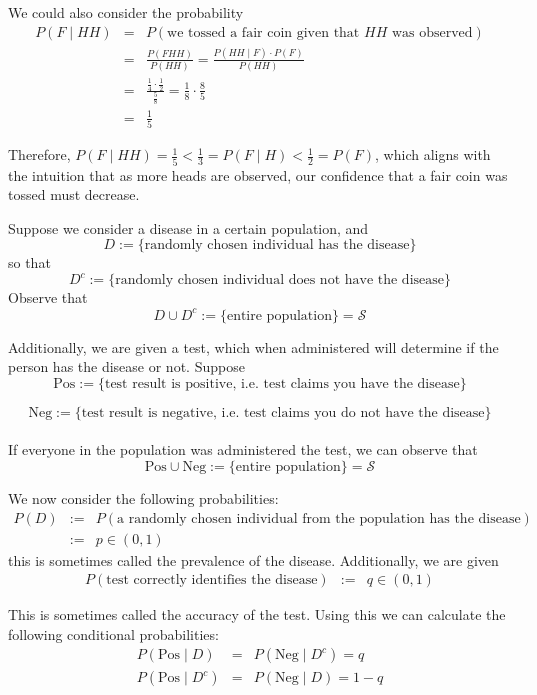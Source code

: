 \begin{ex}
We could also consider the probability  
\begin{eqnarray*}
P(F\mid HH) &=& P(\text{we tossed a fair coin given that $HH$ was observed})\\
&=& \frac{P(FHH)}{P(HH)}=\frac{P(HH\mid F)\cdot P(F)}{P(HH)}\\
&=&\frac{\frac{1}{4}\cdot \frac{1}{2}}{\frac{5}{8}}=\frac{1}{8}\cdot \frac{8}{5}\\
&=&\frac{1}{5}
\end{eqnarray*}

Therefore, $P(F\mid HH)=\frac{1}{5}<\frac{1}{3}=P(F\mid H)<\frac{1}{2}=P(F)$, which aligns with the intuition that as more heads are observed, our confidence that a fair coin was tossed must decrease.
\end{ex}

\begin{ex}
Suppose we consider a disease in a certain population, and 
$$ D:= \{\text{randomly chosen individual has the disease}\}$$ 
so that 
$$D^c:= \{\text{randomly chosen individual does  not have the disease}\}$$
Observe that $$D\cup D^c := \{ \text{entire population}\} = \mathcal{S}$$

Additionally, we are given a test, which when administered will determine if the person has the disease or not. Suppose 
$$ \text{Pos} := \{\text{test result is positive, i.e. test claims you have the disease}\}$$

$$ \text{Neg} := \{\text{test result is negative, i.e. test claims you do not have the disease}\}$$
\\
If everyone in the population was administered the test, we can observe that $$\text{Pos}\cup \text{Neg} := \{ \text{entire population}\} = \mathcal{S}$$

We now consider the following probabilities:
\begin{eqnarray*}
    P(D)&:=& P(\text{a randomly chosen individual from the population has the disease}) \\
    &:=& p \in (0,1) 
\end{eqnarray*}
this is sometimes called the prevalence of the disease. Additionally, we are given 
\begin{eqnarray*}
    P(\text{test correctly identifies the disease})&:=& q \in (0,1) 
\end{eqnarray*}

This is sometimes called the accuracy of the test. Using this we can calculate the following conditional probabilities:
\begin{eqnarray*}
    P(\text{Pos}\mid D)&=& P(\text{Neg}\mid D^c) = q \\
    P(\text{Pos} \mid D^c) &=& P(\text{Neg}\mid D) = 1-q
\end{eqnarray*}


\end{ex}
